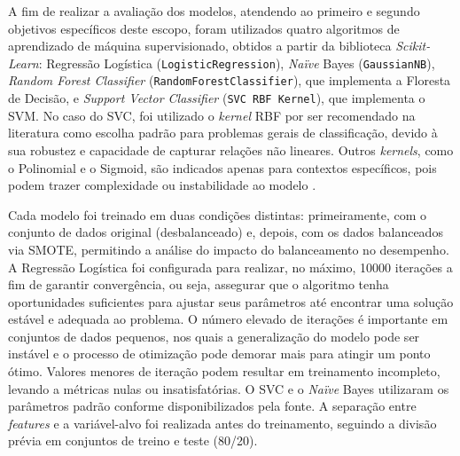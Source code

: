 \documentclass[conference]{IEEEtran}
\begin{document}
A fim de realizar a avaliação dos modelos, atendendo ao primeiro e segundo objetivos específicos deste escopo, foram utilizados quatro algoritmos de aprendizado de máquina supervisionado, obtidos a partir da biblioteca \textit{Scikit-Learn}: Regressão Logística (\verb|LogisticRegression|), \textit{Naïve} Bayes (\verb|GaussianNB|), \textit{\textit{Random Forest} Classifier} (\verb|RandomForestClassifier|), que implementa a Floresta de Decisão, e \textit{Support Vector Classifier} (\verb|SVC RBF Kernel|), que implementa o SVM. No caso do SVC, foi utilizado o \textit{kernel} RBF por ser recomendado na literatura como escolha padrão para problemas gerais de classificação, devido à sua robustez e capacidade de capturar relações não lineares. Outros \textit{kernels}, como o Polinomial e o Sigmoid, são indicados apenas para contextos específicos, pois podem trazer complexidade ou instabilidade ao modelo \cite{b7}.

Cada modelo foi treinado em duas condições distintas: primeiramente, com o conjunto de dados original (desbalanceado) e, depois, com os dados balanceados via SMOTE, permitindo a análise do impacto do balanceamento no desempenho. A Regressão Logística foi configurada para realizar, no máximo, 10000 iterações a fim de garantir convergência, ou seja, assegurar que o algoritmo tenha oportunidades suficientes para ajustar seus parâmetros até encontrar uma solução estável e adequada ao problema. O número elevado de iterações é importante em conjuntos de dados pequenos, nos quais a generalização do modelo pode ser instável e o processo de otimização pode demorar mais para atingir um ponto ótimo. Valores menores de iteração podem resultar em treinamento incompleto, levando a métricas nulas ou insatisfatórias. O SVC e o \textit{Naïve} Bayes utilizaram os parâmetros padrão conforme disponibilizados pela fonte. A separação entre \textit{features} e a variável-alvo foi realizada antes do treinamento, seguindo a divisão prévia em conjuntos de treino e teste (80/20). 
\end{document}
